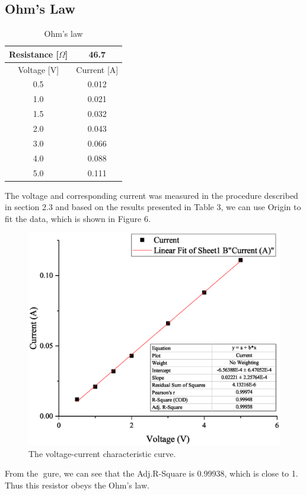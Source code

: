 \documentclass[a4paper]{report}
\begin{document}
	\subsection{Ohm's Law}
	\begin{table}[H]
		\centering
		\begin{tabular}{|c|c|}
			\hline
			Resistance [$\Omega$]&46.7\\
			\hline
			Voltage [V]&Current [A]\\
			\hline
			0.5&0.012\\
			\hline
			1.0&0.021\\
			\hline
			1.5&0.032\\
			\hline
			2.0&0.043\\
			\hline
			3.0&0.066\\
			\hline
			4.0&0.088\\
			\hline
			5.0&0.111\\
			\hline
		\end{tabular}
		\caption{Ohm's law}
	\end{table}
	The voltage and corresponding current was measured in the procedure described in section 2.3 and based on the results presented in Table 3, we can use Origin to fit the data, which is shown in Figure 6.
	\begin{figure}[H]
		\centering
		\includegraphics[width=1\linewidth]{6.eps}
		\caption{The voltage-current characteristic curve.}
	\end{figure}
	From the gure, we can see that the Adj.R-Square is 0.99938, which is close to 1. Thus this resistor obeys the Ohm's law.
\end{document}
